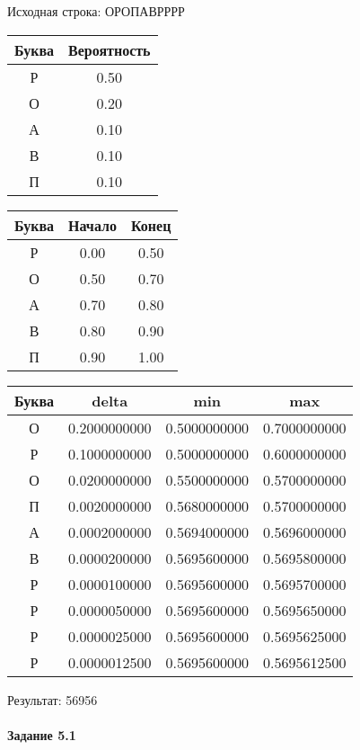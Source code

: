 \documentclass[a4paper, 12pt]{article}
\begin{document}
Исходная строка: ОРОПАВРРРР\
\begin{center}
 \begin{tabular}{ |c|c| } 
  \hline
     Буква & Вероятность \\ \hline
Р & 0.50\\\hline
О & 0.20\\\hline
А & 0.10\\\hline
В & 0.10\\\hline
П & 0.10
\\ \hline \end{tabular}
\end{center}
\begin{center}
 \begin{tabular}{ |c|c|c| } 
  \hline
     Буква & Начало & Конец \\ \hline
Р & 0.00 & 0.50\\\hline
О & 0.50 & 0.70\\\hline
А & 0.70 & 0.80\\\hline
В & 0.80 & 0.90\\\hline
П & 0.90 & 1.00
\\ \hline \end{tabular}
\end{center}
\begin{center}
 \begin{tabular}{ |c|c|c|c| } 
  \hline
     Буква & delta & min & max \\ \hline
О & 0.2000000000 & 0.5000000000 & 0.7000000000\\\hline
Р & 0.1000000000 & 0.5000000000 & 0.6000000000\\\hline
О & 0.0200000000 & 0.5500000000 & 0.5700000000\\\hline
П & 0.0020000000 & 0.5680000000 & 0.5700000000\\\hline
А & 0.0002000000 & 0.5694000000 & 0.5696000000\\\hline
В & 0.0000200000 & 0.5695600000 & 0.5695800000\\\hline
Р & 0.0000100000 & 0.5695600000 & 0.5695700000\\\hline
Р & 0.0000050000 & 0.5695600000 & 0.5695650000\\\hline
Р & 0.0000025000 & 0.5695600000 & 0.5695625000\\\hline
Р & 0.0000012500 & 0.5695600000 & 0.5695612500
\\ \hline \end{tabular}
\end{center}
Результат: 56956
\pagebreak
\paragraph{Задание 5.1 \\
}
\end{document}
